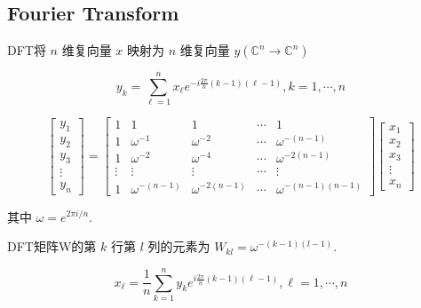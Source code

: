 \subsection{Fourier Transform}

\begin{definition}
    DFT将 $ n $ 维复向量 $ x $ 映射为 $ {n} $ 维复向量 $ y\left(\mathbb{C}^{n} \rightarrow \mathbb{C}^{n}\right) $

    \begin{equation} y_{k}=\sum_{\ell=1}^{n} x_{\ell} e^{-i \frac{2 \pi}{n}(k-1)(\ell-1)}, k=1, \cdots, n \end{equation}

    \begin{equation} \left[\begin{array}{c}y_{1} \\ y_{2} \\ y_{3} \\ \vdots \\ y_{n}\end{array}\right]=\left[\begin{array}{ccccc}1 & 1 & 1 & \cdots & 1 \\ 1 & \omega^{-1} & \omega^{-2} & \cdots & \omega^{-(n-1)} \\ 1 & \omega^{-2} & \omega^{-4} & \cdots & \omega^{-2(n-1)} \\ \vdots & \vdots & \vdots & \cdots & \vdots \\ 1 & \omega^{-(n-1)} & \omega^{-2(n-1)} & \cdots & \omega^{-(n-1)(n-1)}\end{array}\right]\left[\begin{array}{c}x_{1} \\ x_{2} \\ x_{3} \\ \vdots \\ x_{n}\end{array}\right] \end{equation}

   其中 $ \omega=e^{2 \pi i / n} $.
\end{definition}

DFT矩阵W的第 $ k $ 行第 $ l $ 列的元素为 $ W_{k l}=\omega^{-(k-1)(l-1)} $.

\begin{definition}
    \begin{equation} x_{\ell}=\frac{1}{n} \sum_{k=1}^{n} y_{k} e^{i \frac{2 \pi}{n}(k-1)(\ell-1)}, \ell=1, \cdots, n \end{equation}
\end{definition}

